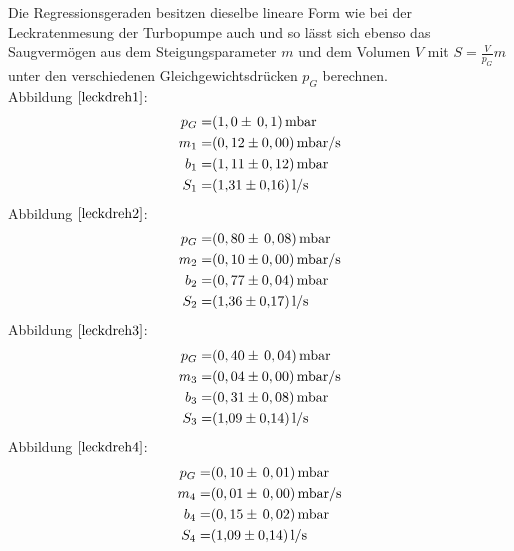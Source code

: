 Die Regressionsgeraden besitzen dieselbe lineare Form wie bei der Leckratenmesung der Turbopumpe auch und so lässt sich ebenso das Saugvermögen
aus dem Steigungsparameter $m$ und dem Volumen $V$ mit $S=\frac{V}{p_G}m$ unter den verschiedenen Gleichgewichtsdrücken $p_G$ berechnen.\\
Abbildung $\ref{leckdreh1}$:
	\begin{align*}
		p_G=& (1,0 \pm \, 0,1)  \, \si{mbar}\\
		m_1=& (0,12 \pm 0,00) \, \si{mbar/s}\\
		b_1=& (1,11 \pm 0,12) \, \si{mbar}\\
		S_1=& \SI{1,31 \pm 0,16}{l/s}
	\end{align*}
	Abbildung $\ref{leckdreh2}$:
		\begin{align*}
			p_G=& (0,80 \pm \, 0,08) \, \si{mbar}\\
			m_2=& (0,10 \pm 0,00) \, \si{mbar/s}\\
			b_2=& (0,77 \pm 0,04) \, \si{mbar}\\
			S_2=& \SI{1,36 \pm 0,17}{l/s}
		\end{align*}
		Abbildung $\ref{leckdreh3}$:
			\begin{align*}
				p_G=& (0,40 \pm \, 0,04) \, \si{mbar}\\
				m_3=& (0,04 \pm 0,00)\, \si{mbar/s}\\
				b_3=& (0,31 \pm 0,08) \, \si{mbar}\\
				S_3=& \SI{1,09 \pm 0,14}{l/s}
			\end{align*}
		Abbildung $\ref{leckdreh4}$:
			\begin{align*}
				p_G=& (0,10 \pm \, 0,01) \, \si{mbar}\\
				m_4=& (0,01 \pm \, 0,00) \, \si{mbar/s}\\
				b_4=& (0,15 \pm \, 0,02) \, \si{mbar}\\
				S_4=& \SI{1,09 \pm 0,14}{l/s}
			\end{align*}
